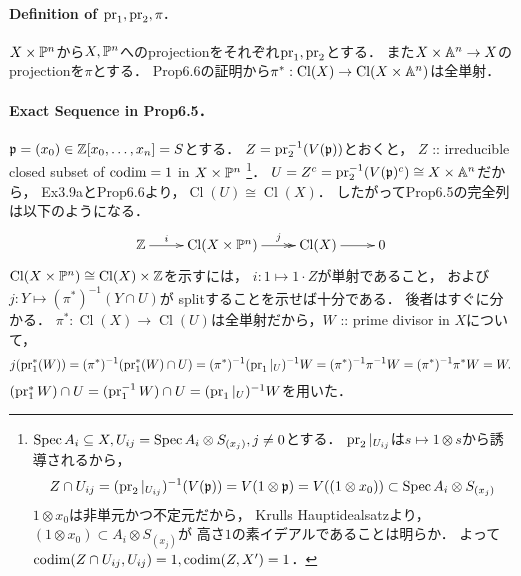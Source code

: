 \documentclass[a4paper]{jsarticle}
\newcommand{\Cl}{\operatorname{Cl}}
\begin{document}
    \paragraph{Definition of $\operatorname{pr}_1, \operatorname{pr}_2, \pi$.}
    $X \times \mathbb{P}^n$から$X, \mathbb{P}^n$へのprojectionをそれぞれ$\operatorname{pr}_1, \operatorname{pr}_2$とする．
    また$X \times \mathbb{A}^n \to X$のprojectionを$\pi$とする．
    Prop6.6の証明から$\pi^*: \Cl(X) \to \Cl(X \times \affine^n)$は全単射．

    \paragraph{Exact Sequence in Prop6.5．}
    $\mathfrak{p}=(x_0) \in \mathbb{Z}[x_0,\dots,x_n]=S$とする．
    $Z=\operatorname{pr}_2^{-1}(V(\mathfrak{p}))$とおくと，
    $Z$ :: irreducible closed subset of $\operatorname{codim}=1$ in $X \times \mathbb{P}^n$
    \footnote
        {
            $\operatorname{Spec} A_i \subseteq X, U_{ij}=\operatorname{Spec} A_i \otimes S_{(x_j)}, j \neq 0$とする．
            $\operatorname{pr}_2|_{U_{ij}}$は$s \mapsto 1 \otimes s$から誘導されるから，
            \[
                Z \cap U_{ij}
                =(\operatorname{pr}_2|_{U_{ij}})^{-1}(V(\mathfrak{p}))
                =V(1 \otimes \mathfrak{p})=V((1 \otimes x_0))
                \subset \operatorname{Spec} A_i \otimes S_{(x_j)}
            \]
            $1 \otimes x_0$は非単元かつ不定元だから，
            Krulls Hauptidealsatzより，
            $(1 \otimes x_0) \subset A_i \otimes S_{(x_j)}$が
            高さ$1$の素イデアルであることは明らか．
            よって$\operatorname{codim} (Z \cap U_{ij}, U_{ij})=1, \operatorname{codim}(Z,X')=1$．
        }．
    $U=Z^c=\operatorname{pr}_2^{-1}(V(\mathfrak{p})^c) \cong X \times \mathbb{A}^n$だから，
    Ex3.9aとProp6.6より，$\Cl(U) \cong \Cl(X)$．
    したがってProp6.5の完全列は以下のようになる．
    \[
    \xymatrix
    {
        \Z \ar[r]^-{i}& \Cl(X \times \proj^n) \ar@{->>}[r]^-{j}& \Cl(X) \ar[r]& 0
    }
    \]
    $\Cl(X \times \proj^n) \cong \Cl(X) \times \Z$を示すには，
    $i: 1 \mapsto 1 \cdot Z$が単射であること，
    および$j: Y \mapsto (\pi^*)^{-1}(Y \cap U)$が
    splitすることを示せば十分である．
    後者はすぐに分かる．
    $\pi^*: \Cl(X) \to \Cl(U)$は全単射だから，$W$ :: prime divisor in $X$について，
    \[ j(\operatorname{pr}_1^*(W))=(\pi^*)^{-1}(\operatorname{pr}_1^*(W) \cap U)=(\pi^*)^{-1}(\operatorname{pr}_1|_U)^{-1} W=(\pi^*)^{-1}\pi^{-1}W=(\pi^*)^{-1}\pi^* W=W. \]
    $(\operatorname{pr}_1^*W) \cap U=(\operatorname{pr}_1^{-1}W) \cap U=(\operatorname{pr}_1|_U)^{-1} W$を用いた．
\end{document}
